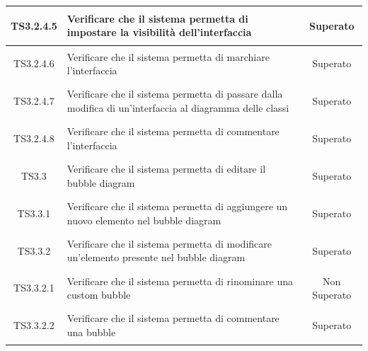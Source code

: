 \documentclass[../PianoDiQualifica.tex]{subfiles}
\begin{document}
\begin{longtable}{|c|>{\centering}p{10cm}|c|}
	\hline
	\hypertarget{TS3.2.4.5}{TS3.2.4.5} & Verificare che il sistema permetta di impostare la visibilità dell'interfaccia & Superato \\
	\hline
	\hypertarget{TS3.2.4.6}{TS3.2.4.6} & Verificare che il sistema permetta di marchiare l'interfaccia & Superato \\
	\hline
	\hypertarget{TS3.2.4.7}{TS3.2.4.7} & Verificare che il sistema permetta di passare dalla modifica di un'interfaccia al diagramma delle classi & Superato \\
	\hline
	\hypertarget{TS3.2.4.8}{TS3.2.4.8} & Verificare che il sistema permetta di commentare l'interfaccia & Superato \\

	
	\hline
	\hypertarget{TS3.3}{TS3.3} & Verificare che il sistema permetta di editare il bubble diagram & Superato \\
	\hline
	\hypertarget{TS3.3.1}{TS3.3.1} & Verificare che il sistema permetta di aggiungere un nuovo elemento nel bubble diagram & Superato \\
	\hline
	\hypertarget{TS3.3.2}{TS3.3.2} & Verificare che il sistema permetta di modificare un'elemento presente nel bubble diagram & Superato \\
	\hline
	\hypertarget{TS3.3.2.1}{TS3.3.2.1} & Verificare che il sistema permetta di rinominare una custom bubble & Non Superato\\
	\hline
	\hypertarget{TS3.3.2.2}{TS3.3.2.2} & Verificare che il sistema permetta di commentare una bubble & Superato \\

\end{longtable}
\end{document}
